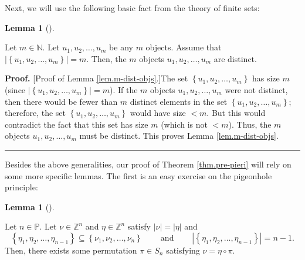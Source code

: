 \documentclass[numbers=enddot,12pt,final,onecolumn,notitlepage,english]{scrartcl}%
\theoremstyle{definition}
\newtheorem{lem}[theo]{Lemma}
\newenvironment{lemma}[1][]
{\begin{lem}[#1]\begin{leftbar}}
{\end{leftbar}\end{lem}}
\newenvironment{proof}[1][Proof]{\noindent\textbf{#1.} }{\ \rule{0.5em}{0.5em}}
\newenvironment{verlong}{}{}
\begin{document}
\begin{verlong}
Next, we will use the following basic fact from the theory of finite sets:

\begin{lemma}
\label{lem.m-dist-objs}Let $m\in\mathbb{N}$. Let $u_{1},u_{2},\ldots,u_{m}$ be
any $m$ objects. Assume that $\left\vert \left\{  u_{1},u_{2},\ldots
,u_{m}\right\}  \right\vert =m$. Then, the $m$ objects $u_{1},u_{2}%
,\ldots,u_{m}$ are distinct.
\end{lemma}

\begin{proof}
[Proof of Lemma \ref{lem.m-dist-objs}.]The set $\left\{  u_{1},u_{2}%
,\ldots,u_{m}\right\}  $ has size $m$ (since $\left\vert \left\{  u_{1}%
,u_{2},\ldots,u_{m}\right\}  \right\vert =m$). If the $m$ objects $u_{1}%
,u_{2},\ldots,u_{m}$ were not distinct, then there would be fewer than $m$
distinct elements in the set $\left\{  u_{1},u_{2},\ldots,u_{m}\right\}  $;
therefore, the set $\left\{  u_{1},u_{2},\ldots,u_{m}\right\}  $ would have
size $<m$. But this would contradict the fact that this set has size $m$
(which is not $<m$). Thus, the $m$ objects $u_{1},u_{2},\ldots,u_{m}$ must be
distinct. This proves Lemma \ref{lem.m-dist-objs}.
\end{proof}
\end{verlong}

Besides the above generalities, our proof of Theorem \ref{thm.pre-pieri} will
rely on some more specific lemmas. The first is an easy exercise on the
pigeonhole principle:

\begin{lemma}
\label{lem.nu-eta}Let $n\in\mathbb{P}$. Let $\nu\in\mathbb{Z}^{n}$ and
$\eta\in\mathbb{Z}^{n}$ satisfy $\left\vert \nu\right\vert =\left\vert
\eta\right\vert $ and%
\[
\left\{  \eta_{1},\eta_{2},\ldots,\eta_{n-1}\right\}  \subseteq\left\{
\nu_{1},\nu_{2},\ldots,\nu_{n}\right\}  \ \ \ \ \ \ \ \ \ \ \text{and}%
\ \ \ \ \ \ \ \ \ \ \left\vert \left\{  \eta_{1},\eta_{2},\ldots,\eta
_{n-1}\right\}  \right\vert =n-1.
\]
Then, there exists some permutation $\pi\in S_{n}$ satisfying $\nu=\eta
\circ\pi$.
\end{lemma}
\end{document}
